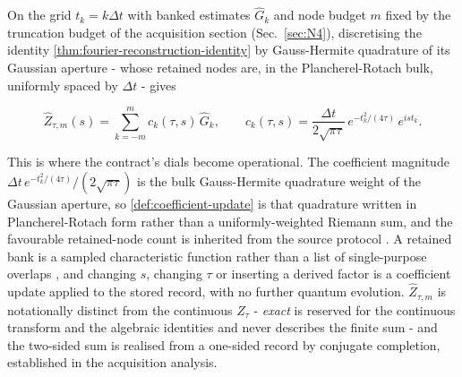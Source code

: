 On the grid $t_k=k\Delta t$ with banked estimates $\widehat G_k$ and node budget $m$ fixed by the truncation budget of the acquisition section (Sec.~\ref{sec:N4}), discretising the identity \eqref{thm:fourier-reconstruction-identity} by Gauss-Hermite quadrature of its Gaussian aperture - whose retained nodes are, in the Plancherel-Rotach bulk, uniformly spaced by $\Delta t$ - gives
\begin{widetext}
\begin{equation}\label{def:coefficient-update}
\widehat Z_{\tau,m}(s)=\sum_{k=-m}^{m}c_k(\tau,s)\,\widehat G_k,\qquad c_k(\tau,s)=\frac{\Delta t}{2\sqrt{\pi\tau}}\,e^{-t_k^{2}/(4\tau)}\,e^{ist_k}.
\end{equation}
\end{widetext}
This is where the contract's dials become operational. The coefficient magnitude $\Delta t\,e^{-t_k^{2}/(4\tau)}/(2\sqrt{\pi\tau})$ is the bulk Gauss-Hermite quadrature weight of the Gaussian aperture, so \eqref{def:coefficient-update} is that quadrature written in Plancherel-Rotach form rather than a uniformly-weighted Riemann sum, and the favourable retained-node count is inherited from the source protocol \cite{mccaul2025snacks,leamer2024emulation}. A retained bank is a sampled characteristic function rather than a list of single-purpose overlaps \cite{somma2019eigenvalue,obrien2019qpe}, and changing $s$, changing $\tau$ or inserting a derived factor is a coefficient update applied to the stored record, with no further quantum evolution. $\widehat Z_{\tau,m}$ is notationally distinct from the continuous $Z_\tau$ - \emph{exact} is reserved for the continuous transform and the algebraic identities and never describes the finite sum - and the two-sided sum is realised from a one-sided record by conjugate completion, established in the acquisition analysis.

